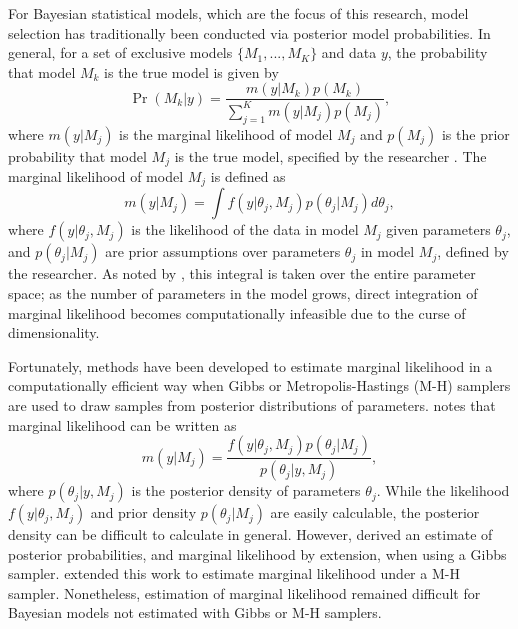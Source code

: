\documentclass[twocolumn]{article}
\begin{document}
For Bayesian statistical models, which are the focus of this research, model selection has traditionally been conducted via posterior model probabilities. In general, for a set of exclusive models $\{M_1, ..., M_K\}$ and data $y$, the probability that model $M_k$ is the true model is given by
\begin{equation}
	\Pr(M_k|y) = \frac{m(y|M_k)p(M_k)}{\sum_{j=1}^K m(y|M_j)p(M_j)},
\end{equation}
where $m(y|M_j)$ is the marginal likelihood of model $M_j$ and $p(M_j)$ is the prior probability that model $M_j$ is the true model, specified by the researcher \citep{KassRaftery}. The marginal likelihood of model $M_j$ is defined as
\begin{equation}
m(y|M_j) = \int f(y|\theta_j, M_j) p(\theta_j|M_j)d\theta_j,
\end{equation}
where $f(y|\theta_j, M_j)$ is the likelihood of the data in model $M_j$ given parameters $\theta_j$, and $p(\theta_j|M_j)$ are prior assumptions over parameters $\theta_j$ in model $M_j$, defined by the researcher. As noted by \cite{KassRaftery}, this integral is taken over the entire parameter space; as the number of parameters in the model grows, direct integration of marginal likelihood becomes computationally infeasible due to the curse of dimensionality.

Fortunately, methods have been developed to estimate marginal likelihood in a computationally efficient way when Gibbs or Metropolis-Hastings (M-H) samplers are used to draw samples from posterior distributions of parameters. \cite{Chib} notes that marginal likelihood can be written as 
\begin{equation}
	\label{eq:MLChib}
	m(y|M_j) = \frac{f(y|\theta_j, M_j)p(\theta_j|M_j)}{p(\theta_j|y, M_j)},
\end{equation}
where $p(\theta_j|y, M_j)$ is the posterior density of parameters $\theta_j$. While the likelihood $f(y|\theta_j, M_j)$ and prior density $p(\theta_j|M_j)$ are easily calculable, the posterior density can be difficult to calculate in general. However, \cite{Chib} derived an estimate of posterior probabilities, and marginal likelihood by extension, when using a Gibbs sampler. \cite{ChibJeliazkov} extended this work to estimate marginal likelihood under a M-H sampler. Nonetheless, estimation of marginal likelihood remained difficult for Bayesian models not estimated with Gibbs or M-H samplers.
\end{document}
